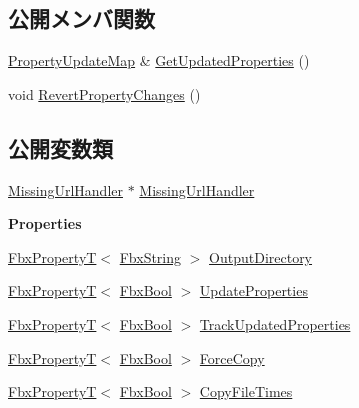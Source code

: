\subsection*{公開メンバ関数}
\begin{DoxyCompactItemize}
\item 
\hyperlink{class_fbx_processor_x_ref_copy_af0408f51b60aa6c9fb8aab6e73f57eb7}{Property\+Update\+Map} \& \hyperlink{class_fbx_processor_x_ref_copy_a71fbf7f8e597830ae72f1427894484c4}{Get\+Updated\+Properties} ()
\item 
void \hyperlink{class_fbx_processor_x_ref_copy_acb594ac9c10bdc9cf32efb2a64840654}{Revert\+Property\+Changes} ()
\end{DoxyCompactItemize}
\subsection*{公開変数類}
\begin{DoxyCompactItemize}
\item 
\hyperlink{class_fbx_processor_x_ref_copy_1_1_missing_url_handler}{Missing\+Url\+Handler} $\ast$ \hyperlink{class_fbx_processor_x_ref_copy_a13a7ad375e5d3abb72b393d005edd75e}{Missing\+Url\+Handler}
\end{DoxyCompactItemize}
\begin{Indent}\textbf{ Properties}\par
\begin{DoxyCompactItemize}
\item 
\hyperlink{class_fbx_property_t}{Fbx\+PropertyT}$<$ \hyperlink{class_fbx_string}{Fbx\+String} $>$ \hyperlink{class_fbx_processor_x_ref_copy_ae6b30eabb327bb56e3e2cf5b7b829e29}{Output\+Directory}
\item 
\hyperlink{class_fbx_property_t}{Fbx\+PropertyT}$<$ \hyperlink{fbxtypes_8h_a92e0562b2fe33e76a242f498b362262e}{Fbx\+Bool} $>$ \hyperlink{class_fbx_processor_x_ref_copy_a3e375b4793e369ff82265b61d56ebb91}{Update\+Properties}
\item 
\hyperlink{class_fbx_property_t}{Fbx\+PropertyT}$<$ \hyperlink{fbxtypes_8h_a92e0562b2fe33e76a242f498b362262e}{Fbx\+Bool} $>$ \hyperlink{class_fbx_processor_x_ref_copy_a0b9debffb0e6257ae9cbeec846ca72d0}{Track\+Updated\+Properties}
\item 
\hyperlink{class_fbx_property_t}{Fbx\+PropertyT}$<$ \hyperlink{fbxtypes_8h_a92e0562b2fe33e76a242f498b362262e}{Fbx\+Bool} $>$ \hyperlink{class_fbx_processor_x_ref_copy_ad0ab8028a48ec1f2062a75aab8f1b023}{Force\+Copy}
\item 
\hyperlink{class_fbx_property_t}{Fbx\+PropertyT}$<$ \hyperlink{fbxtypes_8h_a92e0562b2fe33e76a242f498b362262e}{Fbx\+Bool} $>$ \hyperlink{class_fbx_processor_x_ref_copy_af289c6fcb05767b0ef362376790efee7}{Copy\+File\+Times}
\end{DoxyCompactItemize}
\end{Indent}
